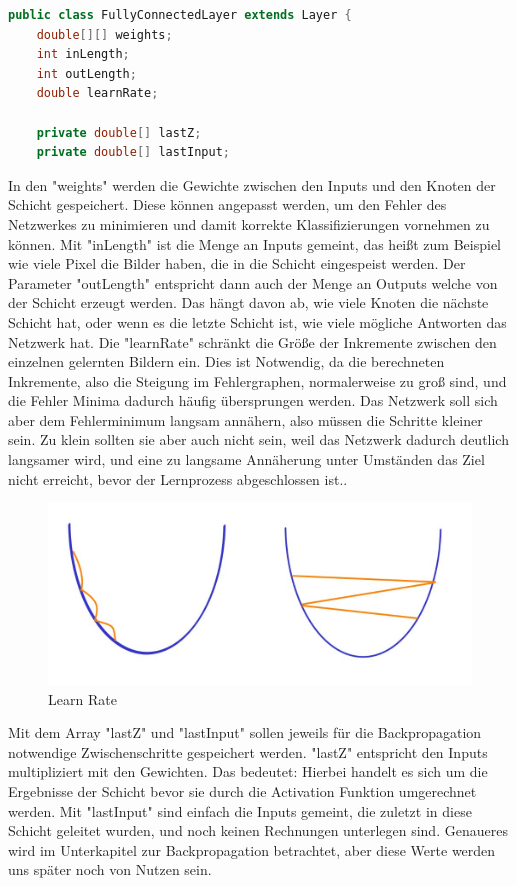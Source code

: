 \documentclass[12pt]{article}
\begin{document}
\begin{lstlisting}[language=Java]
public class FullyConnectedLayer extends Layer {
    double[][] weights;
    int inLength;
    int outLength;
    double learnRate;

    private double[] lastZ;
    private double[] lastInput;
\end{lstlisting} 
In den "weights" werden die Gewichte zwischen den Inputs und den Knoten der Schicht gespeichert. Diese können angepasst werden, um den Fehler des Netzwerkes zu minimieren und damit korrekte Klassifizierungen vornehmen zu können.
Mit "inLength" ist die Menge an Inputs gemeint, das heißt zum Beispiel wie viele Pixel die Bilder haben, die in die Schicht eingespeist werden.
Der Parameter "outLength" entspricht dann auch der Menge an Outputs welche von der Schicht erzeugt werden. Das hängt davon ab, wie viele Knoten die nächste Schicht hat, oder wenn es die letzte Schicht ist, wie viele mögliche Antworten das Netzwerk hat.
Die "learnRate" schränkt die Größe der Inkremente zwischen den einzelnen gelernten Bildern ein. Dies ist Notwendig, da die berechneten Inkremente, also die Steigung im Fehlergraphen, normalerweise zu groß sind, und die Fehler Minima dadurch häufig übersprungen werden. Das Netzwerk soll sich aber dem Fehlerminimum langsam annähern, also müssen die Schritte kleiner sein. Zu klein sollten sie aber auch nicht sein, weil das Netzwerk dadurch deutlich langsamer wird, und eine zu langsame Annäherung unter Umständen das Ziel nicht erreicht, bevor der Lernprozess abgeschlossen ist..


\begin{figure}[H]
\centering
\includegraphics[scale=0.50]{./Images/BA_006_LearnRate.jpg}
\caption{Learn Rate}
\label{Learn Rate}
\end{figure}

Mit dem Array "lastZ" und "lastInput" sollen jeweils für die Backpropagation notwendige Zwischenschritte gespeichert werden. "lastZ" entspricht den Inputs multipliziert mit den Gewichten. Das bedeutet: Hierbei handelt es sich um die Ergebnisse der Schicht bevor sie durch die Activation Funktion umgerechnet werden. Mit "lastInput" sind einfach die Inputs gemeint, die zuletzt in diese Schicht geleitet wurden, und noch keinen Rechnungen unterlegen sind. Genaueres wird im Unterkapitel zur Backpropagation betrachtet, aber diese Werte werden uns später noch von Nutzen sein.
\end{document}
